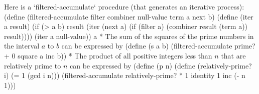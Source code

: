 Here is a `filtered-accumulate` procedure (that generates an iterative process):
\begtt\scm
(define (filtered-accumulate filter combiner null-value term a next b)
  (define (iter a result)
    (if (> a b)
        result
        (iter (next a)
              (if (filter a)
                  (combiner result (term a))
                  result))))
  (iter a null-value))
\endtt
\begitems\style a
* The sum of the squares of the prime numbers in the interval $a$ to $b$ can be expressed by
\begtt\scm
(define (s a b)
  (filtered-accumulate prime? + 0 square a inc b))
\endtt
* The product of all positive integers less than $n$ that are relatively prime to $n$ can be expressed by
\begtt\scm
(define (p n)
  (define (relatively-prime? i)
    (= 1 (gcd i n)))
  (filtered-accumulate relatively-prime? * 1 identity 1 inc (- n 1)))
\endtt
\enditems
